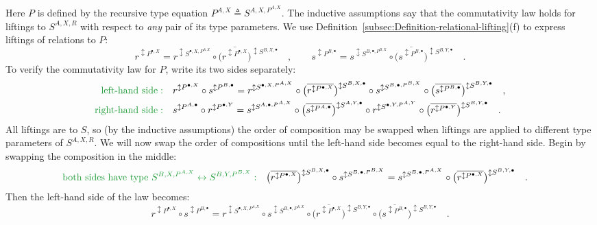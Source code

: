 Here $P$ is defined by the recursive type equation $P^{A,X}\triangleq S^{A,X,P^{A,X}}$.
The inductive assumptions say that the commutativity law holds for
liftings to $S^{A,X,R}$ with respect to \emph{any} pair of its type
parameters. We use Definition~\ref{subsec:Definition-relational-lifting}(f)
to express liftings of relations to $P$:
\[
r^{\updownarrow P^{\bullet,X}}=r^{\updownarrow S^{\bullet,X,P^{A,X}}}\circ\big(\overline{r^{\updownarrow P^{\bullet,X}}}\big)^{\updownarrow S^{B,X,\bullet}}\quad,\quad\quad s^{\updownarrow P^{B,\bullet}}=s^{\updownarrow S^{B,\bullet,P^{B,X}}}\circ\big(\overline{s^{\updownarrow P^{B,\bullet}}}\big)^{\updownarrow S^{B,Y,\bullet}}\quad.
\]
To verify the commutativity law for $P$, write its two sides separately:
\begin{align*}
{\color{greenunder}\text{left-hand side}:}\quad & r^{\updownarrow P^{\bullet,X}}\circ s^{\updownarrow P^{B,\bullet}}=r^{\updownarrow S^{\bullet,X,P^{A,X}}}\circ\big(\overline{r^{\updownarrow P^{\bullet,X}}}\big)^{\updownarrow S^{B,X,\bullet}}\circ s^{\updownarrow S^{B,\bullet,P^{B,X}}}\circ\big(\overline{s^{\updownarrow P^{B,\bullet}}}\big)^{\updownarrow S^{B,Y,\bullet}}\quad,\\
{\color{greenunder}\text{right-hand side}:}\quad & s^{\updownarrow P^{A,\bullet}}\circ r^{\updownarrow P^{\bullet,Y}}=s^{\updownarrow S^{A,\bullet,P^{A,X}}}\circ\big(\overline{s^{\updownarrow P^{A,\bullet}}}\big)^{\updownarrow S^{A,Y,\bullet}}\circ r^{\updownarrow S^{\bullet,Y,P^{A,Y}}}\circ\big(\overline{r^{\updownarrow P^{\bullet,Y}}}\big)^{\updownarrow S^{B,Y,\bullet}}\quad.
\end{align*}
All liftings are to $S$, so (by the inductive assumptions) the order
of composition may be swapped when liftings are applied to different
type parameters of $S^{A,X,R}$. We will now swap the order of compositions
until the left-hand side becomes equal to the right-hand side. Begin
by swapping the composition in the middle:
\begin{align*}
{\color{greenunder}\text{both sides have type }S^{B,X,P^{A,X}}\leftrightarrow S^{B,Y,P^{B,X}}:}\quad & \big(\overline{r^{\updownarrow P^{\bullet,X}}}\big)^{\updownarrow S^{B,X,\bullet}}\circ s^{\updownarrow S^{B,\bullet,P^{B,X}}}=s^{\updownarrow S^{B,\bullet,P^{A,X}}}\circ\big(\overline{r^{\updownarrow P^{\bullet,X}}}\big)^{\updownarrow S^{B,Y,\bullet}}\quad.
\end{align*}
Then the left-hand side of the law becomes:
\[
r^{\updownarrow P^{\bullet,X}}\circ s^{\updownarrow P^{B,\bullet}}=r^{\updownarrow S^{\bullet,X,P^{A,X}}}\circ s^{\updownarrow S^{B,\bullet,P^{A,X}}}\circ\big(\overline{r^{\updownarrow P^{\bullet,X}}}\big)^{\updownarrow S^{B,Y,\bullet}}\circ\big(\overline{s^{\updownarrow P^{B,\bullet}}}\big)^{\updownarrow S^{B,Y,\bullet}}\quad.
\]
